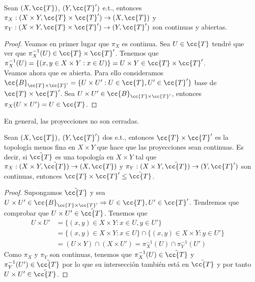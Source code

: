 \begin{prop}
    Sean $(X, \cc{T})$, $(Y, \cc{T}')$ e.t., entonces $\pi_X:(X\times Y, \cc{T}\times \cc{T}')\to (X, \cc{T})$ y $\pi_Y:(X\times Y, \cc{T}\times \cc{T}')\to (Y, \cc{T}')$ son continuas y abiertas.
    \begin{proof}
        Veamos en primer lugar que $\pi_X$ es continua. Sea $U\in \cc{T}$ tendré que ver que $\pi_X^{-1}(U)\in \cc{T}\times \cc{T}'$. Tenemos que $\pi_X^{-1}(U) = \{(x,y\in X\times Y : x\in U)\} = U\times Y \in \cc{T}\times \cc{T}'$.\\

        Veamos ahora que es abierta. Para ello consideramos $\cc{B}_{\cc{T}\times \cc{T}'}=\{U\times U' : U \in \cc{T}, U'\in \cc{T}'\}$ base de $\cc{T}\times \cc{T}'$. Sea $U\times U'\in \cc{B}_{\cc{T}\times \cc{T}'}$, entonces $\pi_X(U\times U')=U\in \cc{T}$.

    \end{proof}
\end{prop}

\begin{ejercicio}
    En general, las proyecciones no son cerradas.
    \endsquare
\end{ejercicio}

\begin{prop}
    Sean $(X, \cc{T})$, $(Y, \cc{T}')$ dos e.t., entonces $\cc{T}\times \cc{T}'$ es la topología menos fina en $X\times Y$ que hace que las proyecciones sean continuas. Es decir, si $\tilde{\cc{T}}$ es una topología en $X\times Y$ tal que $\pi_X:(X\times Y, \tilde{\cc{T}})\to (X, \cc{T})$ y $\pi_Y:(X\times Y, \tilde{\cc{T}})\to (Y, \cc{T}')$ son continuas, entonces $\cc{T}\times \cc{T}'\leq \tilde{\cc{T}}$.
    \begin{proof}
        Supongamos $\tilde{\cc{T}}$ y sea $U\times U'\in \cc{B}_{\cc{T}\times \cc{T}'}\Rightarrow U\in \cc{T}, U'\in \cc{T}'$. Tendremos que comprobar que $U\times U'\in \tilde{\cc{T}}$. Tenemos que
        \begin{align*}
            U\times U' &= \{(x,y)\in X\times Y : x\in U, y \in U'\} \\
            &= \{(x,y)\in X\times Y : x\in U\} \cap \{(x,y)\in X\times Y :y\in U'\} \\
            &= (U \times Y) \cap (X\times U') = \pi_X^{-1}(U) \cap \pi_Y^{-1}(U')
        \end{align*}
        Como $\pi_X$ y $\pi_Y$ son continuas, tenemos que $\pi_X^{-1}(U)\in \tilde{\cc{T}}$ y $\pi_Y^{-1}(U')\in \tilde{\cc{T}}$ por lo que su intersección también está en $\tilde{\cc{T}}$ y por tanto $U\times U'\in \tilde{\cc{T}}$.

    \end{proof}
\end{prop}

